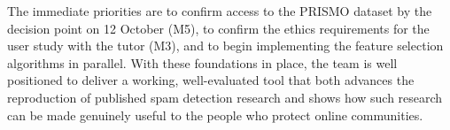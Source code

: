 The immediate priorities are to confirm access to the PRISMO dataset by the decision point on 12 October (M5), to confirm the ethics requirements for the user study with the tutor (M3), and to begin implementing the feature selection algorithms in parallel. With these foundations in place, the team is well positioned to deliver a working, well-evaluated tool that both advances the reproduction of published spam detection research and shows how such research can be made genuinely useful to the people who protect online communities.
